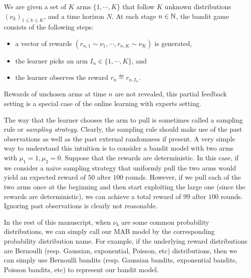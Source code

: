 \begin{definition}\label{def:mab.mab}
\begin{leftbar}[defnbar]
	We are given a set of $K$ arms $\{1,\cdots,K\}$ that follow $K$ unknown distributions $(\nu_k)_{1 \leq k \leq K}$, and a time horizon $N$. At each stage $n\in{\mathbb N}$, the bandit game consists of the following steps:
	\begin{itemize}
		\item a vector of rewards $(r_{n,1} \sim \nu_1, \cdots, r_{n,K} \sim \nu_K)$ is generated,
		\item the learner picks an arm $I_n \in \{1,\cdots,K\}$, and
		\item the learner observes the reward $r_n \eqdef r_{n,I_n}$.
	\end{itemize}
\end{leftbar}
\end{definition}

\begin{remark}\label{remark:mab.partial}
\begin{leftbar}[remarkbar]
	Rewards of unchosen arms at time $n$ are not revealed, this partial feedback setting is a special case of the online learning with experts setting.
\end{leftbar}
\end{remark}

The way that the learner chooses the arm to pull is sometimes called a \gls{sampling rule} or \emph{sampling strategy}. Clearly, the sampling rule should make use of the past observations as well as the past external randomness if present. A very simple way to understand this intuition is to consider a bandit model with two arms with $\mu_1=1, \mu_2=0$. Suppose that the rewards are deterministic. In this case, if we consider a naive sampling strategy that uniformly pull the two arms would yield an expected reward of $50$ after $100$ rounds. However, if we pull each of the two arms once at the beginning and then start exploiting the large one (since the rewards are deterministic), we can achieve a total reward of $99$ after $100$ rounds. Ignoring past observations is clearly not reasonable.

In the rest of this manuscript, when $\nu_k$ are some common probability distributions, we can simply call our MAB model by the corresponding probability distribution name. For example, if the underlying reward distributions are Bernoulli (resp. Gaussian, exponential, Poisson, etc) distributions, then we can simply use Bernoulli bandits (resp. Gaussian bandits, exponential bandits, Poisson bandits, etc) to represent our bandit model. 

